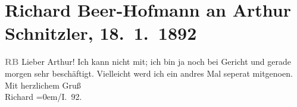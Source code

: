 

         
         \renewcommand{\erwaehntePersonen}{Personen: Richard Beer-Hofmann}
         \renewcommand{\erwaehnteOrte}{Orte: Wien}
         \renewcommand{\erwaehnteWerke}{}
               \section[Richard Beer-Hofmann an Arthur Schnitzler, 18. 1. 1892]{ Richard Beer-Hofmann an Arthur Schnitzler, 18. 1. 1892}\nopagebreak{}\rehead{ }\begin{ledgroupsized}[t]{13cm}\normalsize\beginnumbering{} \toendnotes[C]{\smallbreak\pagebreak[2]} 
\pstart
           \noindent{}{\pb}\textcolor{gray}{\textbf{RB}}\pend
           \pstart\center{}Lieber Arthur!\pend\pstart
           Ich kann nicht mit; ich bin ja noch bei Gericht und gerade morgen sehr beschäftigt.
               Vielleicht werd ich ein andres Mal seperat mitgeno{\geminationm}en.\pend
           \pstart
           Mit herzlichem Gruß{\\[\baselineskip]}\spacefill\mbox{Richard}\pend
           \leftskip=0em{}/I. 92.\pend
           
         
         \endnumbering{}\end{ledgroupsized}  \newcommand{\dateiname}{L00063}\newcommand{\titel}{Richard Beer-Hofmann an Arthur Schnitzler, 18. 1. 1892}\newcommand{\editorInnen}{Martin Anton Müller und Gerd-Hermann Susen}
      